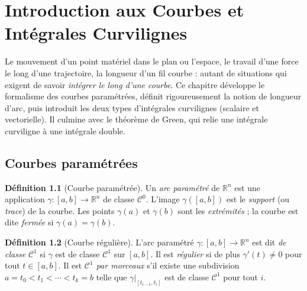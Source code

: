 \documentclass[12pt,a4paper,openany]{book}
\theoremstyle{definition}
\newtheorem{definition}{Définition}[chapter]
\newcommand{\R}{\mathbb{R}}
\begin{document}

\chapter{Introduction aux Courbes et Intégrales Curvilignes}
\label{chap:courbes-integrales-curvilignes}


Le mouvement d'un point matériel dans le plan ou l'espace, le travail
d'une force le long d'une trajectoire, la longueur d'un fil courbe :
autant de situations qui exigent de savoir \emph{intégrer le long
d'une courbe}. Ce chapitre développe le formalisme des courbes
paramétrées, définit rigoureusement la notion de longueur d'arc, puis
introduit les deux types d'intégrales curvilignes (scalaire et
vectorielle). Il culmine avec le théorème de Green, qui relie une
intégrale curviligne à une intégrale double.



\section{Courbes paramétrées}
\label{sec:courbes-parametrees}


\begin{definition}[Courbe paramétrée]\label{def:courbe-parametree}
  Un \emph{arc paramétré} de $\R^n$ est une
  application $\gamma\colon [a,b] \to \R^n$ de classe $\mathcal{C}^0$.
  L'image $\gamma([a,b])$ est le \emph{support} (ou \emph{trace}) de
  la courbe. Les points $\gamma(a)$ et $\gamma(b)$ sont les
  \emph{extrémités} ; la courbe est dite \emph{fermée} si
  $\gamma(a) = \gamma(b)$.
\end{definition}

\begin{definition}[Courbe régulière]\label{def:courbe-reguliere}
  L'arc paramétré $\gamma\colon [a,b]\to\R^n$ est dit \emph{de classe
  $\mathcal{C}^1$} si $\gamma$ est de classe $\mathcal{C}^1$ sur
  $[a,b]$. Il est \emph{régulier} si de plus
  $\gamma'(t) \neq 0$ pour tout $t \in [a,b]$. Il est
  \emph{$\mathcal{C}^1$ par morceaux} s'il existe une subdivision $a = t_0 < t_1 < \cdots < t_k = b$
  telle que $\gamma|_{[t_{i-1},t_i]}$ est de classe $\mathcal{C}^1$ pour
  tout $i$.
\end{definition}
\end{document}
